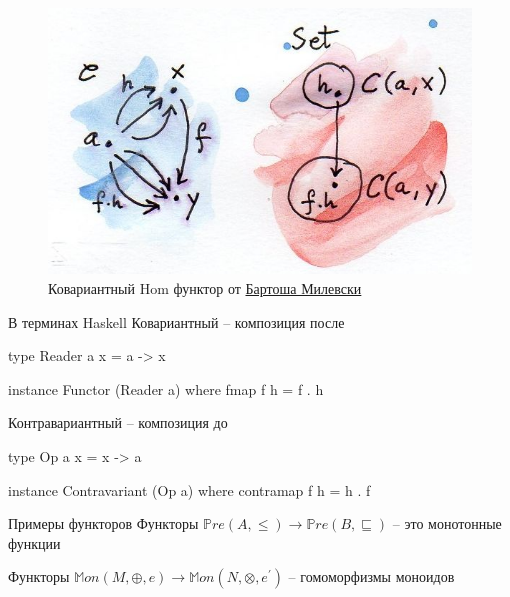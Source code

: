 \documentclass[
  russian,
  aspectratio=169,
  xcolor={svgnames},
  hyperref={colorlinks,citecolor=DeepPink4}]{beamer}
\begin{document}
\begin{frame}[fragile]
\begin{figure}
\includegraphics{hom-functor.jpg}
\caption{Ковариантный Hom функтор от \href{https://bartoszmilewski.files.wordpress.com/2015/07/hom-functor.jpg}{Бартоша Милевски}}
\end{figure}


\end{frame}

\begin{frame}[fragile]{В терминах Haskell}
Ковариантный -- композиция после
\begin{hslisting}
type Reader a x = a -> x

instance Functor (Reader a) where
    fmap f h = f . h
\end{hslisting}
Контравариантный -- композиция до
\begin{hslisting}
type Op a x = x -> a

instance Contravariant (Op a) where
    contramap f h = h . f
\end{hslisting}

\end{frame}



\begin{frame}[fragile]{Примеры функторов}
Функторы $\mathbb{P}re(A, \leqslant) \rightarrow \mathbb{P}re(B, \sqsubseteq)$ -- это монотонные функции
\vspace{1cm}

Функторы $\mathbb{M}on(M, \oplus, e) \rightarrow \mathbb{M}on(N, \otimes, e^{\prime})$ -- гомоморфизмы моноидов



\end{frame}
\end{document}
